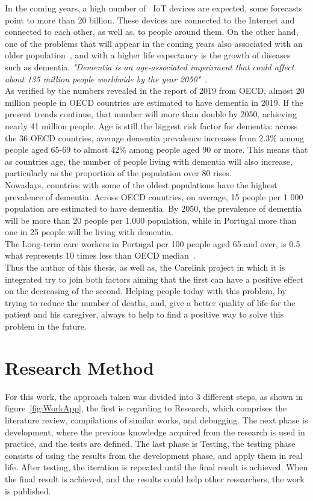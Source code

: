 In the coming years, a high number of ~\gls{IoT} devices are expected, some forecasts point to more than 20 billion. These devices are connected to the Internet and connected to each other, as well as, to people around them. On the other hand, one of the problems that will appear in the coming years also associated with an older population~\cite{pordata_pt,pordata_EU}, and with a higher life expectancy is the growth of diseases such as dementia.
\textit{"Dementia is an age-associated impairment that could affect about 135 million people worldwide by the year 2050"}~\cite{Hammoud2018}.\\
As verified by the numbers revealed in the report of 2019 from OECD, almost 20 million people in OECD countries are estimated to have dementia in 2019. If the present trends continue, that number will more than double by 2050, achieving nearly 41 million people. Age is still the biggest risk factor for dementia: across the 36 OECD countries, average dementia prevalence increases from 2.3\% among people aged 65-69 to almost 42\% among people aged 90 or more.
This means that as countries age, the number of people living with dementia will also increase, particularly as the proportion of the population over 80 rises. \\
Nowadays, countries with some of the oldest populations have the highest prevalence of dementia. Across OECD countries, on average, 15 people per 1 000 population are estimated to have dementia. 
By 2050, the prevalence of dementia will be more than 20 people per 1,000 population, while in Portugal more than one in 25 people will be living with dementia.~\cite{oecdcare}
\\The Long-term care workers in Portugal per 100 people aged 65 and over, is  0.5 what represents 10 times less than OECD median~\cite{OECD2019a}.
\\
Thus the author of this thesis, as well as, the Carelink project in which it is integrated try to join both factors aiming that the first can have a positive effect on the decreasing of the second. Helping people today with this problem, by trying to reduce the number of deaths, and, give a better quality of life for the patient and his caregiver, always to help to find a positive way to solve this problem in the future.

\section{Research Method}
\label{sec:research_method}
For this work, the approach taken was divided into 3 different steps, as shown in figure~\ref{fig:WorkApp}, the first is regarding to Research, which comprises the literature review, compilations of similar works, and debugging. The next phase is development, where the previous knowledge acquired from the research is used in practice, and the tests are defined. The last phase is Testing, the testing phase consists of using the results from the development phase, and apply them in real life. After testing, the iteration is repeated until the final result is achieved. When the final result is achieved, and the results could help other researchers, the work is published.


